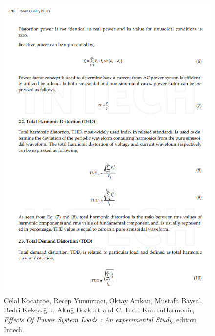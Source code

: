 \begin{figure}[!htb]
	\centering
	\includegraphics[scale=0.8]{thd.png}
	\caption{Celal Kocatepe, Recep Yumurtacı, Oktay Arıkan, Mustafa Baysal, Bedri Kekezoğlu, Altuğ Bozkurt and C. Fadıl KumruHarmonic,
					\textit{Effects Of Power System Loads : An experimental Study}, edition Intech.}
\end{figure}

